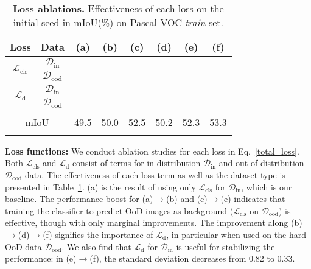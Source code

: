 \documentclass[10pt,twocolumn,letterpaper]{article}
\newcommand{\cmark}{\text{\ding{51}}}
\begin{document}
\begin{table}[t]
\renewcommand{\arraystretch}{0.9}
  \centering
  \small
  \caption{\textbf{Loss ablations.} Effectiveness of each loss on the initial seed in mIoU(\%) on Pascal VOC \textit{train} set.}
  \vspace{-1em}
    \begin{tabular}{cccccccc}
    \Xhline{1pt}
    Loss & Data &(a)&(b)&(c)&(d)&(e)&(f)\\\hline
    \multirow{2}[0]{*}{$\mathcal{L}_\text{cls}$} & $\mathcal{D}_\text{in}$   &   \textcolor{black}{\cmark}    &    \textcolor{black}{\cmark}   &    \textcolor{black}{\cmark}   &  \textcolor{black}{\cmark}  & \textcolor{black}{\cmark}   & \textcolor{black}{\cmark}  \\
& $\mathcal{D}_\text{ood}$   &       &  \textcolor{black}{\cmark}     &       &    \textcolor{black}{\cmark}  & \textcolor{black}{\cmark} &  \textcolor{black}{\cmark} \\
    \hline
    \multirow{2}[0]{*}{$\mathcal{L}_\text{d}$} & $\mathcal{D}_\text{in}$   &       &       &   \textcolor{black}{\cmark}    &     \textcolor{black}{\cmark}  &  &\textcolor{black}{\cmark} \\
          & $\mathcal{D}_\text{ood}$   &       &       &    \textcolor{black}{\cmark}   &       & \textcolor{black}{\cmark}& \textcolor{black}{\cmark}  \\
    \hline\hline \\[-0.9em]
    \multicolumn{2}{c}{mIoU} & 49.5  &  50.0     &  52.5    &    50.2   &52.3&  53.3 \\
    \Xhline{1pt}
    \vspace{-2em}
    \end{tabular}\label{loss_ablation}\end{table} 
\noindent\textbf{Loss functions:} 
We conduct ablation studies for each loss in Eq.~\ref{total_loss}. 
Both $\mathcal{L}_\text{cls}$ and $\mathcal{L}_\text{d}$ consist of terms for in-distribution $\mathcal{D}_\text{in}$ and out-of-distribution $\mathcal{D}_\text{ood}$ data. The effectiveness of each loss term as well as the dataset type is presented in Table~\ref{loss_ablation}. (a) is the result of using only $\mathcal{L}_\text{cls}$ for $\mathcal{D}_\text{in}$, which is our baseline. 
The performance boost for (a)$\rightarrow$(b) and (c)$\rightarrow$(e) indicates that training the classifier to predict OoD images as background ($\mathcal{L}_\text{cls}$ on $\mathcal{D}_\text{ood}$) is effective, though with only marginal improvements.
The improvement along (b)$\rightarrow$(d)$\rightarrow$(f) signifies the importance of $\mathcal{L}_\text{d}$, in particular when used on the hard OoD data $\mathcal{D}_\text{ood}$. We also find that $\mathcal{L}_\text{d}$ for $\mathcal{D}_\text{in}$ is useful for stabilizing the performance: in (e)$\rightarrow$(f), the standard deviation decreases from 0.82 to 0.33.
\end{document}
